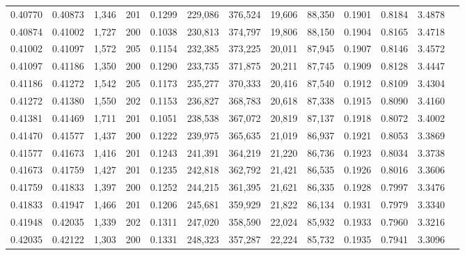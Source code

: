 \begin{tabular}{rrrrrrrrrrrrr}
0.40770 & 0.40873 & 1,346 & 201 &                                     0.1299 & 229,086 & 376,524 &  19,606 &  88,350 & 0.1901 & 0.8184 & 3.4878 \\
0.40874 & 0.41002 & 1,727 & 200 &                                     0.1038 & 230,813 & 374,797 &  19,806 &  88,150 & 0.1904 & 0.8165 & 3.4718 \\
0.41002 & 0.41097 & 1,572 & 205 &                                     0.1154 & 232,385 & 373,225 &  20,011 &  87,945 & 0.1907 & 0.8146 & 3.4572 \\
0.41097 & 0.41186 & 1,350 & 200 &                                     0.1290 & 233,735 & 371,875 &  20,211 &  87,745 & 0.1909 & 0.8128 & 3.4447 \\
0.41186 & 0.41272 & 1,542 & 205 &                                     0.1173 & 235,277 & 370,333 &  20,416 &  87,540 & 0.1912 & 0.8109 & 3.4304 \\
0.41272 & 0.41380 & 1,550 & 202 &                                     0.1153 & 236,827 & 368,783 &  20,618 &  87,338 & 0.1915 & 0.8090 & 3.4160 \\
0.41381 & 0.41469 & 1,711 & 201 &                                     0.1051 & 238,538 & 367,072 &  20,819 &  87,137 & 0.1918 & 0.8072 & 3.4002 \\
0.41470 & 0.41577 & 1,437 & 200 &                                     0.1222 & 239,975 & 365,635 &  21,019 &  86,937 & 0.1921 & 0.8053 & 3.3869 \\
0.41577 & 0.41673 & 1,416 & 201 &                                     0.1243 & 241,391 & 364,219 &  21,220 &  86,736 & 0.1923 & 0.8034 & 3.3738 \\
0.41673 & 0.41759 & 1,427 & 201 &                                     0.1235 & 242,818 & 362,792 &  21,421 &  86,535 & 0.1926 & 0.8016 & 3.3606 \\
0.41759 & 0.41833 & 1,397 & 200 &                                     0.1252 & 244,215 & 361,395 &  21,621 &  86,335 & 0.1928 & 0.7997 & 3.3476 \\
0.41833 & 0.41947 & 1,466 & 201 &                                     0.1206 & 245,681 & 359,929 &  21,822 &  86,134 & 0.1931 & 0.7979 & 3.3340 \\
0.41948 & 0.42035 & 1,339 & 202 &                                     0.1311 & 247,020 & 358,590 &  22,024 &  85,932 & 0.1933 & 0.7960 & 3.3216 \\
0.42035 & 0.42122 & 1,303 & 200 &                                     0.1331 & 248,323 & 357,287 &  22,224 &  85,732 & 0.1935 & 0.7941 & 3.3096 \\

\end{tabular}
